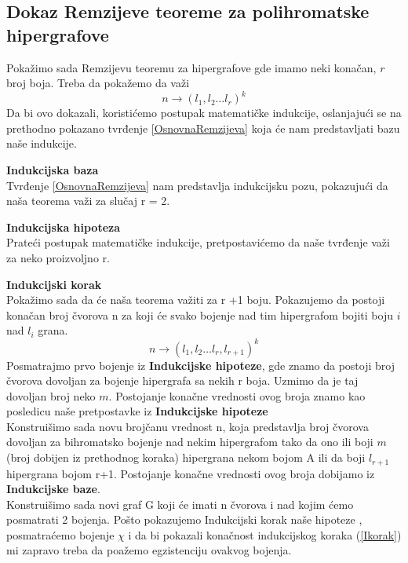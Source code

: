\documentclass[a4paper]{article}
\begin{document}
	\subsection{Dokaz Remzijeve teoreme za polihromatske hipergrafove}
	Pokažimo sada Remzijevu teoremu za hipergrafove gde imamo neki konačan, $r$ broj boja. Treba da pokažemo da važi 
	\begin{equation}
		n \rightarrow (l_1, l_2 \dots l_r)^k
	\end{equation}
	Da bi ovo dokazali, koristićemo postupak matematičke indukcije, oslanjajući se na prethodno pokazano tvrđenje \ref{OsnovnaRemzijeva} koja će nam predstavljati bazu naše indukcije.
	\begin{description}
		\item \textbf{Indukcijska baza} \\
		Tvrđenje \ref{OsnovnaRemzijeva} nam predstavlja indukcijsku pozu, pokazujući da naša teorema važi za slučaj r = 2.\\
		\item \textbf{Indukcijska hipoteza}\\
		Prateći postupak matematičke indukcije, pretpostavićemo da naše tvrđenje važi za neko proizvoljno r.\\
		\item \textbf{Indukcijski korak}\\
		Pokažimo sada da će naša teorema važiti za r +1 boju.
		Pokazujemo da postoji konačan broj čvorova n za koji će svako bojenje nad tim hipergrafom bojiti boju $i$ nad $l_i$ grana. %
		\begin{equation}\label{Ikorak}
		 n \rightarrow (l_1, l_2 \dots l_r, l_{r+1})^k
		\end{equation}
		Posmatrajmo prvo bojenje iz \textbf{Indukcijske hipoteze}, gde znamo da postoji broj čvorova dovoljan za bojenje hipergrafa sa nekih r boja. Uzmimo da je taj dovoljan broj neko $m$. Postojanje konačne vrednosti ovog broja znamo kao posledicu naše pretpostavke iz \textbf{Indukcijske hipoteze}\\
		Konstruišimo sada novu brojčanu vrednost n, koja predstavlja broj čvorova dovoljan za bihromatsko bojenje nad nekim hipergrafom tako da ono ili boji $m$ (broj dobijen iz prethodnog koraka) hipergrana nekom bojom A ili da boji $l_{r+1}$ hipergrana bojom r+1. Postojanje konačne vrednosti ovog broja dobijamo iz \textbf{Indukcijske baze}. 
		\\
		Konstruišimo sada novi graf G koji će imati n čvorova i nad kojim ćemo posmatrati 2 bojenja. Pošto pokazujemo Indukcijski korak naše hipoteze , posmatraćemo bojenje $\chi$ i da bi pokazali konačnost indukcijskog koraka (\ref{Ikorak}) mi zapravo treba da poažemo egzistenciju ovakvog bojenja.

\end{description}
\end{document}

